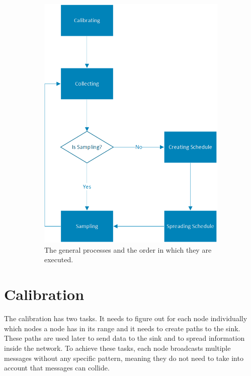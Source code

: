 \begin{figure}[]
\begin{subfigure}[t]{0.4\textwidth}
        \includegraphics[scale=0.7]{content/images/GeneralAproachM}
        \caption{The general processes and the order in which they are executed.}
        \label{fig:processes}
    \end{subfigure}
    \caption{}
\end{figure}
  
\section{Calibration}
\label{chp:apr_calibration}
The calibration has two tasks. It needs to figure out for each node individually which nodes a node has in its range and it needs to create paths to the sink. These paths are used later to send data to the sink and to spread information inside the network. To achieve these tasks, each node broadcasts multiple messages without any specific pattern, meaning they do not need to take into account that messages can collide.

